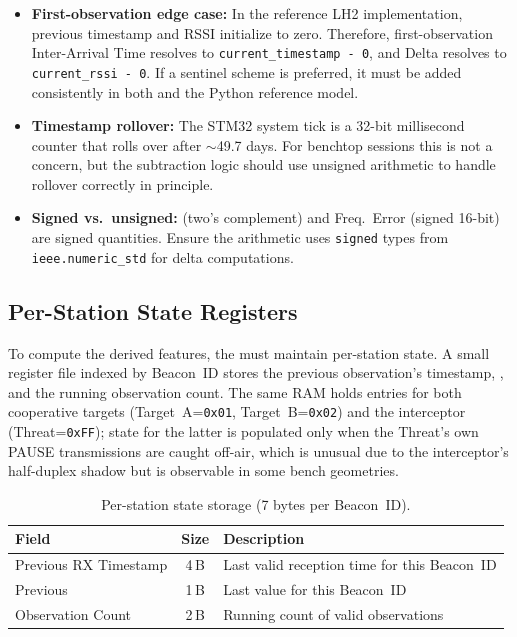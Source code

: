 \documentclass[11pt,letterpaper]{article}
\begin{document}
	\begin{tcolorbox}[warning={Common Pitfalls}]
		\begin{itemize}
			\item \textbf{First-observation edge case:} In the reference LH2 implementation, previous timestamp and RSSI initialize to zero. Therefore, first-observation Inter-Arrival Time resolves to \texttt{current\_timestamp - 0}, and \RSSI{} Delta resolves to \texttt{current\_rssi - 0}. If a sentinel scheme is preferred, it must be added consistently in both \VHDL{} and the Python reference model.
			\item \textbf{Timestamp rollover:} The STM32 system tick is a 32-bit millisecond counter that rolls over after $\sim$49.7 days. For benchtop sessions this is not a concern, but the subtraction logic should use unsigned arithmetic to handle rollover correctly in principle.
			\item \textbf{Signed vs.\ unsigned:} \RSSI{} (two's complement) and Freq.\ Error (signed 16-bit) are signed quantities. Ensure the \VHDL{} arithmetic uses \texttt{signed} types from \texttt{ieee.numeric\_std} for delta computations.
		\end{itemize}
	\end{tcolorbox}

	\subsection{Per-Station State Registers}

	To compute the derived features, the \FPGA{} must maintain per-station state. A small register file indexed by Beacon~ID stores the previous observation's timestamp, \RSSI{}, and the running observation count. The same RAM holds entries for both cooperative targets (Target~A=\texttt{0x01}, Target~B=\texttt{0x02}) and the interceptor (Threat=\texttt{0xFF}); state for the latter is populated only when the Threat's own PAUSE transmissions are caught off-air, which is unusual due to the interceptor's half-duplex shadow but is observable in some bench geometries.

	\begin{table}[ht!]
		\centering
		\caption{Per-station state storage (7 bytes per Beacon~ID).}
		\label{tab:beacon_state}
		\renewcommand{\arraystretch}{1.3}
		\begin{tabularx}{\textwidth}{l c X}
			\toprule
			\textbf{Field} & \textbf{Size} & \textbf{Description} \\
			\midrule
			Previous RX Timestamp & 4\,B & Last valid reception time for this Beacon~ID \\
			Previous \RSSI{} & 1\,B & Last \RSSI{} value for this Beacon~ID \\
			Observation Count & 2\,B & Running count of valid observations \\
			\bottomrule
		\end{tabularx}
	\end{table}
\end{document}
